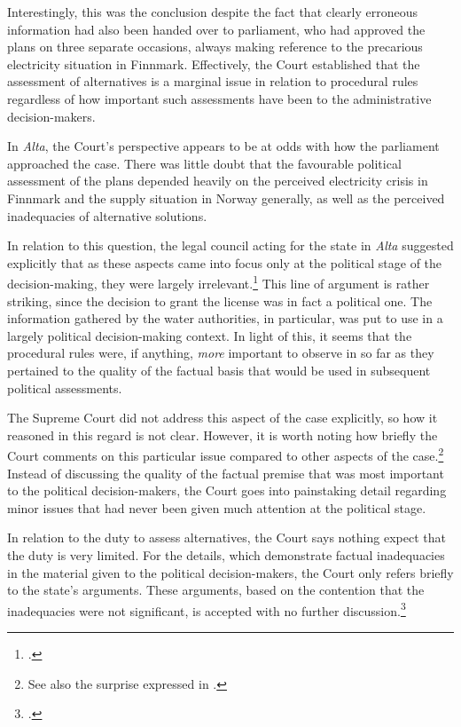 Interestingly, this was the conclusion despite the fact that clearly erroneous information had also been handed over to parliament, who had approved the plans on three separate occasions, always making reference to the precarious electricity situation in Finnmark. Effectively, the Court established that the assessment of alternatives is a marginal issue in relation to procedural rules regardless of how important such assessments have been to the administrative decision-makers.

In {\it Alta}, the Court's perspective appears to be at odds with how the parliament approached the case. There was little doubt that the favourable political assessment of the plans depended heavily on the perceived electricity crisis in Finnmark and the supply situation in Norway generally, as well as the perceived inadequacies of alternative solutions.

In relation to this question, the legal council acting for the state in {\it Alta} suggested explicitly that as these aspects came into focus only at the political stage of the decision-making, they were largely irrelevant.\footcite[341]{alta82} This line of argument is rather striking, since the decision to grant the license was in fact a political one. The information gathered by the water authorities, in particular, was put to use in a largely political decision-making context. In light of this, it seems that the procedural rules were, if anything, {\it more} important to observe in so far as they pertained to the quality of the factual basis that would be used in subsequent political assessments.

The Supreme Court did not address this aspect of the case explicitly, so how it reasoned in this regard is not clear. However, it is worth noting how briefly the Court comments on this particular issue compared to other aspects of the case.\footnote{See also the surprise expressed in \cite[349-351]{eckhoff82}.} Instead of discussing the quality of the factual premise that was most important to the political decision-makers, the Court goes into painstaking detail regarding minor issues that had never been given much attention at the political stage.

In relation to the duty to assess alternatives, the Court says nothing expect that the duty is very limited. For the details, which demonstrate factual inadequacies in the material given to the political decision-makers, the Court only refers briefly to the state's arguments. These arguments, based on the contention that the inadequacies were not significant, is accepted with no further discussion.\footcite[346]{alta82}

